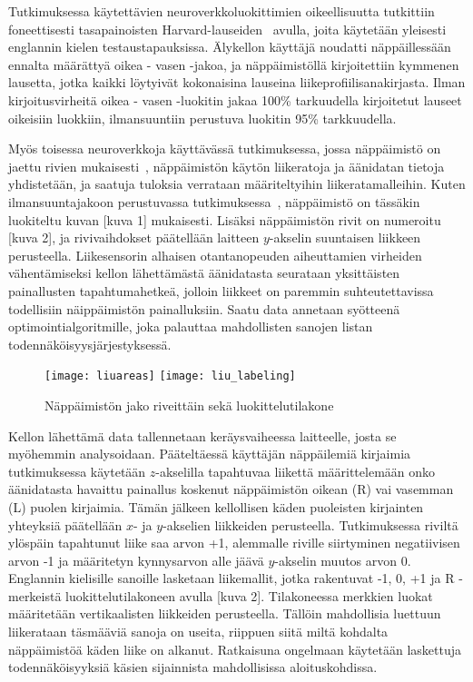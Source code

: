 \documentclass[finnish]{tktltiki2}
\theoremstyle{definition}
\theoremstyle{remark}
\begin{document}
Tutkimuksessa käytettävien neuroverkkoluokittimien oikeellisuutta tutkittiin foneettisesti tasapainoisten Harvard-lauseiden~\cite{har} avulla, joita käytetään yleisesti englannin kielen testaustapauksissa. Älykellon käyttäjä noudatti näppäillessään ennalta määrättyä oikea - vasen -jakoa, ja näppäimistöllä kirjoitettiin kymmenen lausetta, jotka kaikki löytyivät kokonaisina lauseina liikeprofiilisanakirjasta. Ilman kirjoitusvirheitä oikea - vasen -luokitin jakaa 100\% tarkuudella kirjoitetut lauseet oikeisiin luokkiin, ilmansuuntiin perustuva luokitin 95\% tarkkuudella. 

Myös toisessa neuroverkkoja käyttävässä tutkimuksessa, jossa näppäimistö on jaettu rivien mukaisesti~\cite{liu}, näppäimistön käytön liikeratoja ja äänidatan tietoja yhdistetään, ja saatuja tuloksia verrataan määriteltyihin liikeratamalleihin. Kuten ilmansuuntajakoon perustuvassa tutkimuksessa~\cite{maiti}, näppäimistö on tässäkin luokiteltu kuvan [kuva 1] mukaisesti. Lisäksi näppäimistön rivit on numeroitu [kuva 2], ja rivivaihdokset päätellään laitteen $y$-akselin suuntaisen liikkeen perusteella. Liikesensorin alhaisen otantanopeuden aiheuttamien virheiden vähentämiseksi kellon lähettämästä äänidatasta seurataan yksittäisten painallusten tapahtumahetkeä, jolloin liikkeet on paremmin suhteutettavissa todellisiin näippäimistön painalluksiin. Saatu data annetaan syötteenä optimointialgoritmille, joka palauttaa mahdollisten sanojen listan todennäköisyysjärjestyksessä. 

\begin{figure}[!b]
\begin{floatrow}
\texttt{[image: liuareas]}
\texttt{[image: liu\_labeling]}
\caption{Näppäimistön jako riveittäin sekä luokittelutilakone}
\end{floatrow}
\label{fig:liuareas}
\end{figure}

Kellon lähettämä data tallennetaan keräysvaiheessa laitteelle, josta se myöhemmin analysoidaan. Pääteltäessä käyttäjän näppäilemiä kirjaimia tutkimuksessa käytetään $z$-akselilla tapahtuvaa liikettä määrittelemään onko äänidatasta havaittu painallus koskenut näppäimistön oikean (R) vai vasemman (L) puolen kirjaimia. Tämän jälkeen kellollisen käden puoleisten kirjainten yhteyksiä päätellään $x$- ja $y$-akselien liikkeiden perusteella. Tutkimuksessa riviltä ylöspäin tapahtunut liike saa arvon +1, alemmalle riville siirtyminen negatiivisen arvon -1 ja määritetyn kynnysarvon alle jäävä $y$-akselin muutos arvon 0. Englannin kielisille sanoille lasketaan liikemallit, jotka rakentuvat -1, 0, +1 ja R -merkeistä luokittelutilakoneen avulla [kuva 2]. Tilakoneessa merkkien luokat määritetään vertikaalisten liikkeiden perusteella. Tällöin mahdollisia luettuun liikerataan täsmääviä sanoja on useita, riippuen siitä miltä kohdalta näppäimistöä käden liike on alkanut. Ratkaisuna ongelmaan käytetään laskettuja todennäköisyyksiä käsien sijainnista mahdollisissa aloituskohdissa.
\end{document}
